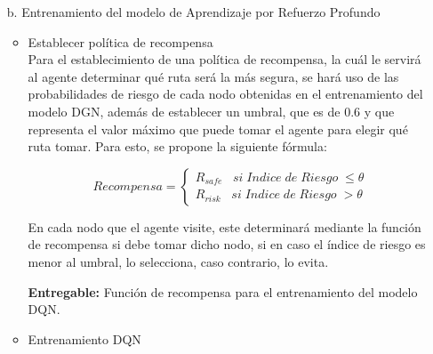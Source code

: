 \begin{itemize}
\item[b.] Entrenamiento del modelo de Aprendizaje por Refuerzo Profundo \\
\begin{itemize}
	\item Establecer política de recompensa \\

Para el establecimiento de una política de recompensa, la cuál le servirá al agente determinar qué ruta será la más segura, se hará uso de las probabilidades de riesgo de cada nodo obtenidas en el entrenamiento del modelo DGN, además de establecer un umbral, que es de 0.6 y que representa el valor máximo que puede tomar el agente para elegir qué ruta tomar. Para esto, se propone la siguiente fórmula:

\begin{equation} 
	Recompensa = \left\{\begin{matrix}
		R_{safe}\; \; \; si\; Indice \;de\;Riesgo\;\leq \theta \\ 
		R_{risk}\; \; \; si\; Indice \;de\;Riesgo\;>  \theta 
	\end{matrix}\right.
\end{equation}

En cada nodo que el agente visite, este determinará mediante la función de recompensa si debe tomar dicho nodo, si en caso el índice de riesgo es menor al umbral, lo selecciona, caso contrario, lo evita.

\textbf{Entregable:} Función de recompensa para el entrenamiento del modelo DQN.

	\item Entrenamiento DQN \\


\end{itemize}
\end{itemize}
